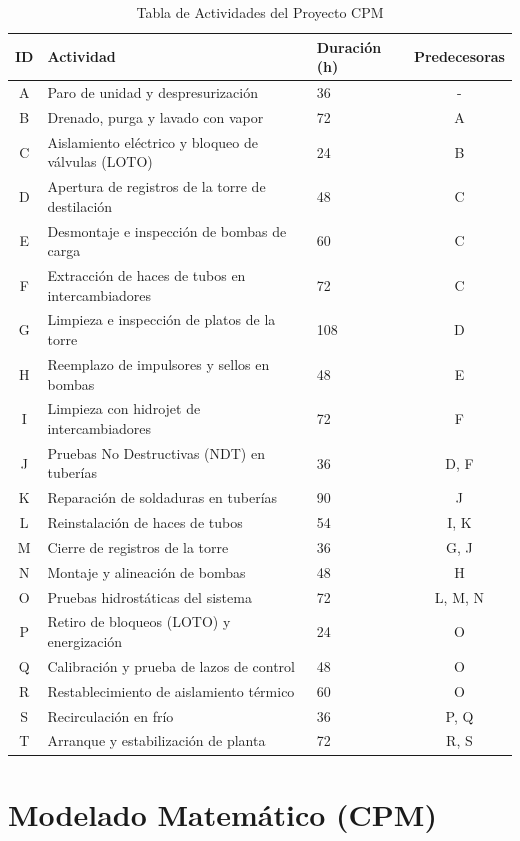 \documentclass[11pt,a4paper]{article}
\begin{document}
\begin{table}[H]
\centering
\begin{tabular}{cllc}
\toprule
\textbf{ID} & \textbf{Actividad} & \textbf{Duración (h)} & \textbf{Predecesoras} \\
\midrule
A & Paro de unidad y despresurización & 36 & - \\
B & Drenado, purga y lavado con vapor & 72 & A \\
C & Aislamiento eléctrico y bloqueo de válvulas (LOTO) & 24 & B \\
D & Apertura de registros de la torre de destilación & 48 & C \\
E & Desmontaje e inspección de bombas de carga & 60 & C \\
F & Extracción de haces de tubos en intercambiadores & 72 & C \\
G & Limpieza e inspección de platos de la torre & 108 & D \\
H & Reemplazo de impulsores y sellos en bombas & 48 & E \\
I & Limpieza con hidrojet de intercambiadores & 72 & F \\
J & Pruebas No Destructivas (NDT) en tuberías & 36 & D, F \\
K & Reparación de soldaduras en tuberías & 90 & J \\
L & Reinstalación de haces de tubos & 54 & I, K \\
M & Cierre de registros de la torre & 36 & G, J \\
N & Montaje y alineación de bombas & 48 & H \\
O & Pruebas hidrostáticas del sistema & 72 & L, M, N \\
P & Retiro de bloqueos (LOTO) y energización & 24 & O \\
Q & Calibración y prueba de lazos de control & 48 & O \\
R & Restablecimiento de aislamiento térmico & 60 & O \\
S & Recirculación en frío & 36 & P, Q \\
T & Arranque y estabilización de planta & 72 & R, S \\
\bottomrule
\end{tabular}
\caption{Tabla de Actividades del Proyecto CPM}
\end{table}

\section{Modelado Matemático (CPM)}
\end{document}
